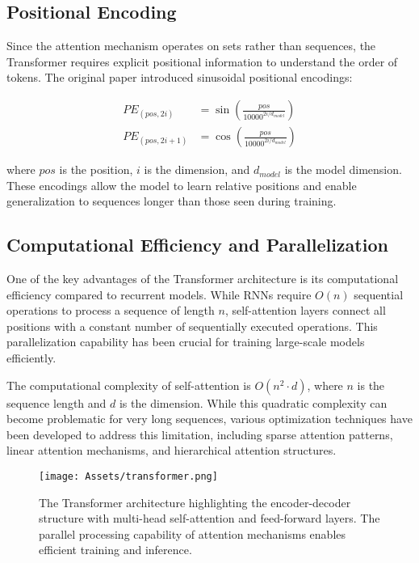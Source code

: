 \subsection{Positional Encoding}

Since the attention mechanism operates on sets rather than sequences, the Transformer requires explicit positional information to understand the order of tokens. The original paper introduced sinusoidal positional encodings:

\begin{align}
PE_{(pos, 2i)} &= \sin\left(\frac{pos}{10000^{2i/d_{model}}}\right) \\
PE_{(pos, 2i+1)} &= \cos\left(\frac{pos}{10000^{2i/d_{model}}}\right)
\end{align}

where $pos$ is the position, $i$ is the dimension, and $d_{model}$ is the model dimension. These encodings allow the model to learn relative positions and enable generalization to sequences longer than those seen during training.

\subsection{Computational Efficiency and Parallelization}

One of the key advantages of the Transformer architecture is its computational efficiency compared to recurrent models. While RNNs require $O(n)$ sequential operations to process a sequence of length $n$, self-attention layers connect all positions with a constant number of sequentially executed operations. This parallelization capability has been crucial for training large-scale models efficiently.

The computational complexity of self-attention is $O(n^2 \cdot d)$, where $n$ is the sequence length and $d$ is the dimension. While this quadratic complexity can become problematic for very long sequences, various optimization techniques have been developed to address this limitation, including sparse attention patterns, linear attention mechanisms, and hierarchical attention structures.

\begin{figure}[H]
    \centering
    \texttt{[image: Assets/transformer.png]}
    \caption{The Transformer architecture highlighting the encoder-decoder structure with multi-head self-attention and feed-forward layers. The parallel processing capability of attention mechanisms enables efficient training and inference.}
    \label{fig:transformer_architecture}
\end{figure}

